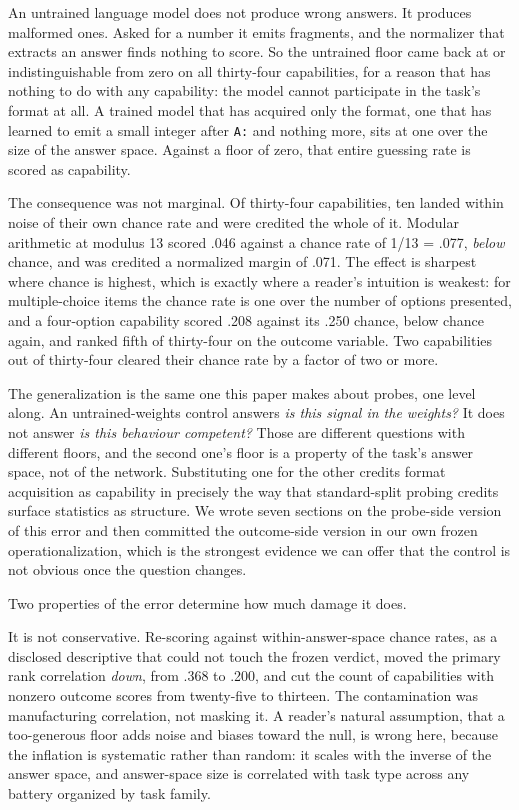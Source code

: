 An untrained language model does not produce wrong answers. It
produces malformed ones. Asked for a number it emits fragments, and
the normalizer that extracts an answer finds nothing to score. So the
untrained floor came back at or indistinguishable from zero on all
thirty-four capabilities, for a reason that has nothing to do with any
capability: the model cannot participate in the task's format at all.
A trained model that has acquired only the format, one that has
learned to emit a small integer after \texttt{A:} and nothing more, sits at
one over the size of the answer space. Against a floor of zero, that entire
guessing rate is scored as capability.

The consequence was not marginal. Of thirty-four capabilities, ten
landed within noise of their own chance rate and were credited the
whole of it. Modular arithmetic at modulus 13 scored .046 against a
chance rate of 1/13 = .077, \emph{below} chance, and was credited a
normalized margin of .071. The effect is sharpest where chance is
highest, which is exactly where a reader's intuition is weakest: for
multiple-choice items the chance rate is one over the number of
options presented, and a four-option capability scored .208 against
its .250 chance, below chance again, and ranked fifth of thirty-four
on the outcome variable. Two capabilities out of thirty-four cleared
their chance rate by a factor of two or more.

The generalization is the same one this paper makes about probes, one
level along. An untrained-weights control answers \emph{is this signal in
the weights?} It does not answer \emph{is this behaviour competent?} Those
are different questions with different floors, and the second one's
floor is a property of the task's answer space, not of the network.
Substituting one for the other credits format acquisition as
capability in precisely the way that standard-split probing credits
surface statistics as structure. We wrote seven sections on the
probe-side version of this error and then committed the outcome-side
version in our own frozen operationalization, which is the strongest
evidence we can offer that the control is not obvious once the
question changes.

Two properties of the error determine how much damage it does.

It is not conservative. Re-scoring against within-answer-space chance
rates, as a disclosed descriptive that could not touch the frozen
verdict, moved the primary rank correlation \emph{down}, from .368 to .200,
and cut the count of capabilities with nonzero outcome scores from
twenty-five to thirteen. The contamination was manufacturing
correlation, not masking it. A reader's natural assumption, that a
too-generous floor adds noise and biases toward the null, is wrong
here, because the inflation is systematic rather than random: it
scales with the inverse of the answer space, and answer-space size is
correlated with task type across any battery organized by task family.

